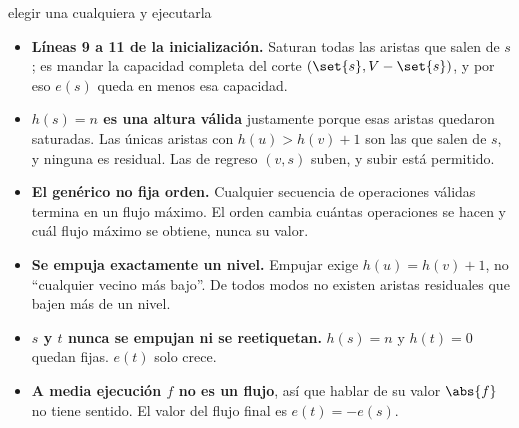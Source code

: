 \documentclass[11pt,letterpaper]{article}
\begin{document}
\begin{algorithm}[H]
\caption{\textsc{Empujar-Reetiquetar-Genérico}$(G)$
         \ (\textsc{Generic-Push-Relabel} en Cormen)}
\label{alg:empujar-reetiquetar-generico}
\begin{algorithmic}[1]
  \State {}
    \State elegir una cualquiera y ejecutarla
  \EndWhile
\EndProcedure
\end{algorithmic}
\end{algorithm}

\begin{itemize}
  \item \textbf{Líneas 9 a 11 de la inicialización.} Saturan todas las
        aristas que salen de $s$; es mandar la capacidad completa del
        corte $(\set{s}, V - \set{s})$, y por eso $e(s)$ queda en menos
        esa capacidad.
  \item \textbf{$h(s) = n$ es una altura válida} justamente porque esas
        aristas quedaron saturadas. Las únicas aristas con
        $h(u) > h(v) + 1$ son las que salen de $s$, y ninguna es
        residual. Las de regreso $(v, s)$ suben, y subir está permitido.
  \item \textbf{El genérico no fija orden.} Cualquier secuencia de
        operaciones válidas termina en un flujo máximo. El orden cambia
        cuántas operaciones se hacen y cuál flujo máximo se obtiene,
        nunca su valor.
\end{itemize}

\begin{ojo}
  \begin{itemize}
    \item \textbf{Se empuja exactamente un nivel.} Empujar exige
          $h(u) = h(v) + 1$, no ``cualquier vecino más bajo''. De todos
          modos no existen aristas residuales que bajen más de un
          nivel.
    \item \textbf{$s$ y $t$ nunca se empujan ni se reetiquetan.}
          $h(s) = n$ y $h(t) = 0$ quedan fijas. $e(t)$ solo crece.
    \item \textbf{A media ejecución $f$ no es un flujo}, así que
          hablar de su valor $\abs{f}$ no tiene sentido. El valor del
          flujo final es $e(t) = -e(s)$.
  \end{itemize}
\end{ojo}

\end{document}
